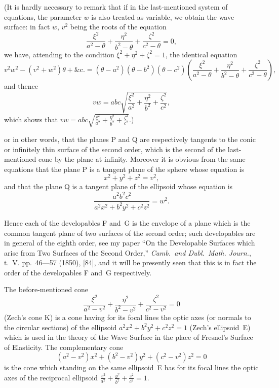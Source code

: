 \documentclass[12pt,a4paper]{article}
\theoremstyle{definition}
\begin{document}
(It is hardly necessary to remark that if in the last-mentioned system of
equations, the parameter $w$ is also treated as variable, we obtain the wave surface:
in fact $w$, $v^{2}$ being the roots of the equation
\[
\frac{\xi^{2}}{a^{2} - \theta} + \frac{\eta^{2}}{b^{2} - \theta} + \frac{\zeta^{2}}{c^{2} - \theta} = 0,
\]
we have, attending to the condition $\xi^{2} + \eta^{2} + \zeta^{2} = 1$, the identical equation
\[
v^{2}w^{2} - (v^{2} + w^{2})\theta + \&\mathrm{c}. =
(\theta - a^{2})(\theta - b^{2})(\theta - c^{2})
\left(\frac{\xi^{2}}{a^{2} - \theta} + \frac{\eta^{2}}{b^{2} - \theta} + \frac{\zeta^{2}}{c^{2} - \theta}\right),
\]
and thence
\[
vw = abc\sqrt{\frac{\xi^{2}}{a^{2}} + \frac{\eta^{2}}{b^{2}} + \frac{\zeta^{2}}{c^{2}}},
\]
which shows that $vw = abc\sqrt{\frac{\xi^{2}}{a^{2}} + \frac{\eta^{2}}{b^{2}} + \frac{\zeta^{2}}{c^{2}}}$.)

or in other words, that the planes P and Q are respectively tangents to the conic or
infinitely thin surface of the second order, which is the second of the last-mentioned
cone by the plane at infinity. Moreover it is obvious from the same equations that
the plane P is a tangent plane of the sphere whose equation is
\[
x^{2} + y^{2} + z^{2} = v^{2},
\]
and that the plane Q is a tangent plane of the ellipsoid whose equation is
\[
\frac{a^{2}b^{2}c^{2}}{a^{2}x^{2} + b^{2}y^{2} + c^{2}z^{2}} = w^{2}.
\]

Hence each of the developables F and~G is the envelope of a plane which is the
common tangent plane of two surfaces of the second order; such developables are in
general of the eighth order, see my paper ``On the Developable Surfaces which arise
from Two Surfaces of the Second Order,'' \textit{Camb.\ and Dubl.\ Math.
Journ.}, t.~V. pp.~46---57 (1850), [84], and it will be presently seen that this is in
fact the order of the developables F and~G respectively.

The before-mentioned cone
\[
\frac{\xi^{2}}{a^{2} - v^{2}} + \frac{\eta^{2}}{b^{2} - v^{2}} + \frac{\zeta^{2}}{c^{2} - v^{2}} = 0
\]
(Zech's cone K) is a cone having for its focal lines the optic axes (or normals to
the circular sections) of the ellipsoid $a^{2}x^{2} + b^{2}y^{2} + c^{2}z^{2} = 1$ (Zech's ellipsoid~E)
which is used in the theory of the Wave Surface in the place of Fresnel's Surface
of Elasticity. The complementary cone
\[
(a^{2} - v^{2})x^{2} + (b^{2} - v^{2})y^{2} + (c^{2} - v^{2})z^{2} = 0
\]
is the cone which standing on the same ellipsoid~E has for its focal lines the optic
axes of the reciprocal ellipsoid $\frac{x^{2}}{a^{2}} + \frac{y^{2}}{b^{2}} + \frac{z^{2}}{c^{2}} = 1$.
\end{document}
